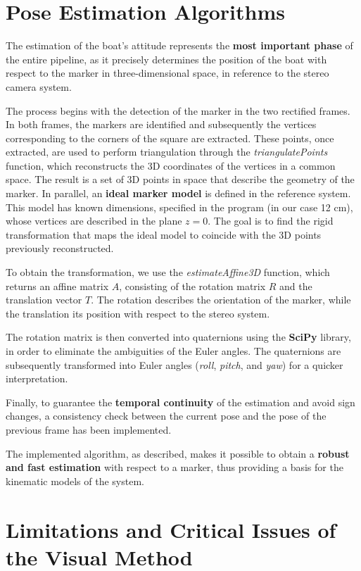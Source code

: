 \section{Pose Estimation Algorithms}
The estimation of the boat’s attitude represents the \textbf{most important phase} of the entire pipeline, as it precisely determines the position of the boat with respect to the marker in three-dimensional space, in reference to the stereo camera system.  

The process begins with the detection of the marker in the two rectified frames. In both frames, the markers are identified and subsequently the vertices corresponding to the corners of the square are extracted. These points, once extracted, are used to perform triangulation through the \textit{triangulatePoints} function, which reconstructs the 3D coordinates of the vertices in a common space. The result is a set of 3D points in space that describe the geometry of the marker.
In parallel, an \textbf{ideal marker model} is defined in the reference system. This model has known dimensions, specified in the program (in our case 12 cm), whose vertices are described in the plane \(z = 0\). The goal is to find the rigid transformation that maps the ideal model to coincide with the 3D points previously reconstructed. 

To obtain the transformation, we use the \textit{estimateAffine3D} function, which returns an affine matrix \(A\), consisting of the rotation matrix \(R\) and the translation vector \(T\). The rotation describes the orientation of the marker, while the translation its position with respect to the stereo system.  

The rotation matrix is then converted into quaternions using the \textbf{SciPy} library, in order to eliminate the ambiguities of the Euler angles. The quaternions are subsequently transformed into Euler angles (\textit{roll}, \textit{pitch}, and \textit{yaw}) for a quicker interpretation.  

Finally, to guarantee the \textbf{temporal continuity} of the estimation and avoid sign changes, a consistency check between the current pose and the pose of the previous frame has been implemented.  

The implemented algorithm, as described, makes it possible to obtain a \textbf{robust and fast estimation} with respect to a marker, thus providing a basis for the kinematic models of the system.

\section{Limitations and Critical Issues of the Visual Method}

